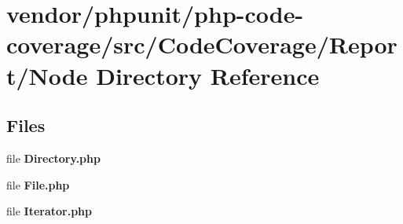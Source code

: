 \section{vendor/phpunit/php-\/code-\/coverage/src/\+Code\+Coverage/\+Report/\+Node Directory Reference}
\label{dir_c5d19ca18345c760a5cfbdc802271c85}
\subsection*{Files}
\begin{DoxyCompactItemize}
\item 
file {\bf Directory.\+php}
\item 
file {\bf File.\+php}
\item 
file {\bf Iterator.\+php}
\end{DoxyCompactItemize}
